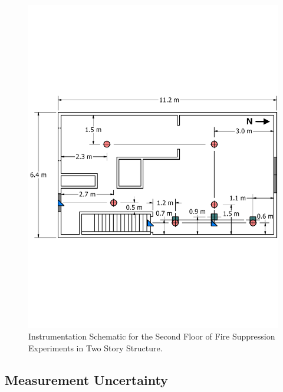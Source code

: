 \documentclass[12pt,oneside]{book}
\begin{document}
\begin{figure}[!ht]
	\includegraphics[width=\columnwidth]{../../DelCo_2014_2015/Drawings/PDFs/CAFS/West_Structure_2nd_Floor_Instrumentation}
	\caption{Instrumentation Schematic for the Second Floor of Fire Suppression Experiments in Two Story Structure.}
	\label{fig:fire_supp_second_2story}
\end{figure}

\clearpage

\subsection{Measurement Uncertainty}
\label{subsec:Uncertainty}
\end{document}
